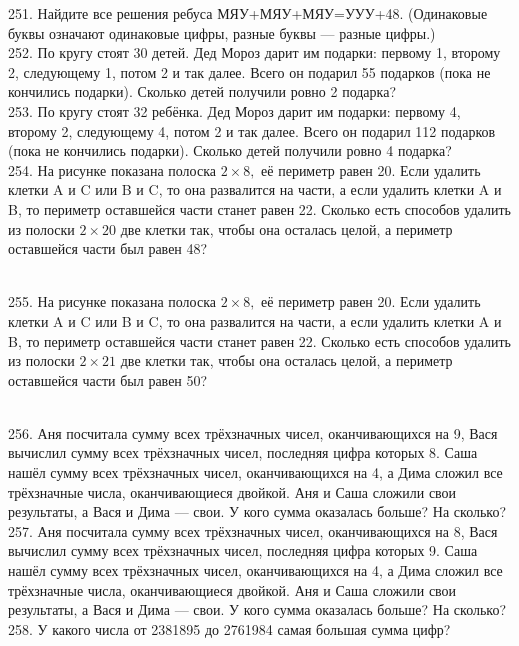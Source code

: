 251. Найдите все решения ребуса МЯУ+МЯУ+МЯУ=УУУ+48. (Одинаковые буквы означают одинаковые цифры, разные буквы --- разные цифры.)\\
252. По кругу стоят 30 детей. Дед Мороз дарит им подарки: первому 1, второму 2, следующему 1, потом 2 и так далее. Всего он подарил 55 подарков (пока не кончились подарки). Сколько детей получили ровно 2 подарка?\\
253. По кругу стоят 32 ребёнка. Дед Мороз дарит им подарки: первому 4, второму 2, следующему 4, потом 2 и так далее. Всего он подарил 112 подарков (пока не кончились подарки). Сколько детей получили ровно 4 подарка?\\
254. На рисунке показана полоска $2\times 8,$ её периметр равен 20. Если удалить клетки A и C или B и C, то она развалится на части, а если удалить клетки A и B, то периметр оставшейся части станет равен 22. Сколько есть способов удалить из полоски $2\times 20$ две клетки так, чтобы она осталась целой, а периметр оставшейся части был равен 48?
\begin{figure}[ht!]
\end{figure}\\
255. На рисунке показана полоска $2\times 8,$ её периметр равен 20. Если удалить клетки A и C или B и C, то она развалится на части, а если удалить клетки A и B, то периметр оставшейся части станет равен 22. Сколько есть способов удалить из полоски $2\times 21$ две клетки так, чтобы она осталась целой, а периметр оставшейся части был равен 50?
\begin{figure}[ht!]
\end{figure}\\
256. Аня посчитала сумму всех трёхзначных чисел, оканчивающихся на 9, Вася вычислил сумму всех трёхзначных чисел, последняя цифра которых 8. Саша нашёл сумму всех трёхзначных чисел, оканчивающихся на 4, а Дима сложил все трёхзначные числа, оканчивающиеся двойкой. Аня и Саша сложили свои результаты, а Вася и Дима --- свои. У кого сумма оказалась больше? На сколько?\\
257. Аня посчитала сумму всех трёхзначных чисел, оканчивающихся на 8, Вася вычислил сумму всех трёхзначных чисел, последняя цифра которых 9. Саша нашёл сумму всех трёхзначных чисел, оканчивающихся на 4, а Дима сложил все трёхзначные числа, оканчивающиеся двойкой. Аня и Саша сложили свои результаты, а Вася и Дима --- свои. У кого сумма оказалась больше? На сколько?\\
258. У какого числа от 2381895 до 2761984 самая большая сумма цифр?\\
